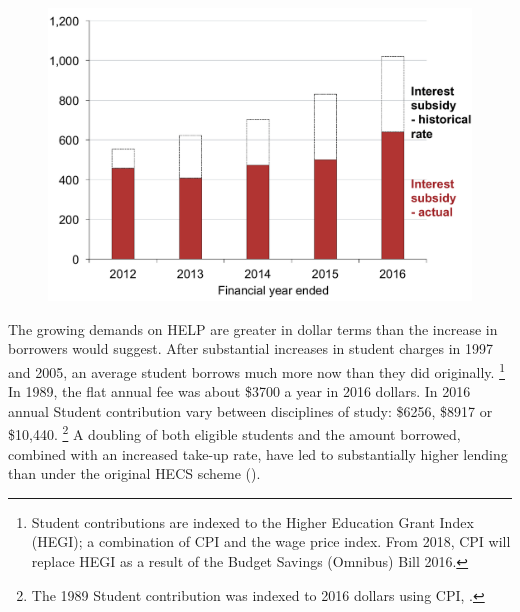 \documentclass{grattan}
\begin{document}
\begin{figure}
\begin{minipage}[t][\textheight]{\columnwidth}
\includegraphics[page=5]{atlas/Chartpack.pdf}

%
{\textcites{EducationvariousyearsSelectedhighereducation}{EducationvariousyearsHighereducationreport}}

\end{minipage}
\end{figure}



The growing demands on \gls{HELP} are greater in dollar terms than the increase in borrowers would suggest.
After substantial increases in student charges in 1997 and 2005, an average student borrows much more now than they did originally.%
   \footnote{Student contributions are indexed to the Higher Education Grant Index (HEGI); a combination of \gls{CPI} and the wage price index.
From 2018, \gls{CPI} will replace HEGI as a result of the Budget Savings (Omnibus) Bill 2016.} In 1989, the flat annual fee was about \$3700 a year in 2016 dollars.
In 2016 annual \gls{Student contribution} vary between disciplines of study: \$6256, \$8917 or \$10,440.%
   \footnote{The 1989 \gls{Student contribution} was indexed to 2016 dollars using \gls{CPI}, \textcites{DET2015FundingClusters}{ABS2016ConsumerPriceIndex}.} 
A doubling of both eligible students and the amount borrowed, combined with an increased take-up rate, have led to substantially higher lending than under the original \gls{HECS} scheme ().
\end{document}
